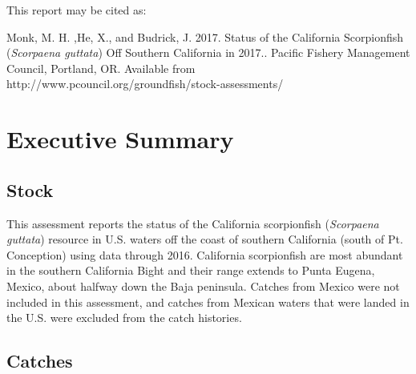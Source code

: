 \documentclass[12pt,]{article}
\begin{document}
\begin{center}
\vspace{.3cm}


\newpage

\begin{flushleft}
This report may be cited as:

Monk, M. H. ,He, X., and Budrick, J. 2017. Status of the California Scorpionfish (\emph{Scorpaena guttata}) Off Southern California in 2017.. Pacific Fishery Management Council, Portland, OR. Available from http://www.pcouncil.org/groundfish/stock-assessments/
\end{flushleft}

\maketitle

\setcounter{page}{1}
\end{center}

{
\setcounter{tocdepth}{4}
\tableofcontents
}
\setlength{\parskip}{5mm plus1mm minus1mm} \pagebreak

\setcounter{page}{1} \renewcommand{\thefigure}{\alph{figure}}
\renewcommand{\thetable}{\alph{table}}

\section*{Executive Summary}\label{executive-summary}

\subsection*{Stock}\label{stock}

This assessment reports the status of the California scorpionfish
(\emph{Scorpaena guttata}) resource in U.S. waters off the coast of
southern California (south of Pt. Conception) using data through 2016.
California scorpionfish are most abundant in the southern California
Bight and their range extends to Punta Eugena, Mexico, about halfway
down the Baja peninsula. Catches from Mexico were not included in this
assessment, and catches from Mexican waters that were landed in the U.S.
were excluded from the catch histories.

\subsection*{Catches}\label{catches}
\end{document}
